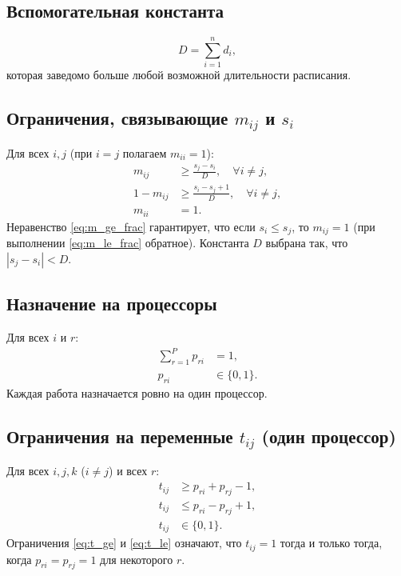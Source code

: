 \subsection*{Вспомогательная константа}

\[
D = \sum_{i=1}^{n} d_i,
\]
которая заведомо больше любой возможной длительности расписания.

\subsection*{Ограничения, связывающие $m_{ij}$ и $s_i$}

Для всех $i,j$ (при $i=j$ полагаем $m_{ii}=1$):
\begin{align}
	m_{ij} &\ge \frac{s_j - s_i}{D}, \quad \forall i\neq j, \label{eq:m_ge_frac}\\
	1 - m_{ij} &\ge \frac{s_i - s_j + 1}{D}, \quad \forall i\neq j, \label{eq:m_le_frac}\\
	m_{ii} &= 1. \label{eq:m_diag}
\end{align}
Неравенство \eqref{eq:m_ge_frac} гарантирует, что если $s_i \le s_j$, то $m_{ij}=1$ (при выполнении \eqref{eq:m_le_frac} обратное). Константа $D$ выбрана так, что $|s_j-s_i| < D$.

\subsection*{Назначение на процессоры}

Для всех $i$ и $r$:
\begin{align}
	\sum_{r=1}^{P} p_{ri} &= 1, \label{eq:p_sum}\\
	p_{ri} &\in \{0,1\}. \nonumber
\end{align}
Каждая работа назначается ровно на один процессор.

\subsection*{Ограничения на переменные $t_{ij}$ (один процессор)}

Для всех $i,j,k$ ($i\neq j$) и всех $r$:
\begin{align}
	t_{ij} &\ge p_{ri} + p_{rj} - 1, \label{eq:t_ge}\\
	t_{ij} &\le p_{ri} - p_{rj} + 1, \label{eq:t_le}\\
	t_{ij} &\in \{0,1\}. \nonumber
\end{align}
Ограничения \eqref{eq:t_ge} и \eqref{eq:t_le} означают, что $t_{ij}=1$ тогда и только тогда, когда $p_{ri}=p_{rj}=1$ для некоторого $r$.

